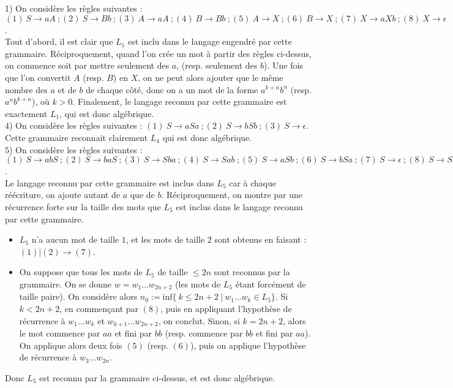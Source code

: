 \documentclass[11pt,a4paper]{article}
\begin{document}
1) On considère les règles suivantes : $(1) \ S \to aA  \ ; (2)  \ S \to Bb \ ; (3) \ A \to aA \ ; (4) \ B \to Bb \ ; (5) \ A \to X \ ; (6) \ B \to X \ ; (7) \ X \to aXb \ ; (8) \ X \to \epsilon$. \\ 
Tout d'abord, il est clair que $L_1$ est inclu dans le langage engendré par cette grammaire. Réciproquement, quand l'on crée un mot à partir des règles ci-dessus, on commence soit par mettre seulement des $a$, (resp. seulement des $b$). Une fois que l'on convertit $A$ (resp. $B$) en $X$, on ne peut alors ajouter que le même nombre des $a$ et de $b$ de chaque côté, donc on a un mot de la forme $a^{k+n}b^n$ (resp. $a^nb^{k+n}$), où $k>0$. Finalement, le langage reconnu par cette grammaire est exactement $L_1$, qui est donc algébrique.
\\

4) On considère les règles suivantes : $ (1) \ S \to aSa \ ; (2) \ S \to bSb \ ; (3) \ S \to \epsilon$. \\ 
Cette grammaire reconnait clairement $L_4$ qui est donc algébrique.
\\

5) On considère les règles suivantes : $(1) \ S \to abS \ ; (2) \ S \to baS \ ; (3) \ S \to Sba \ ; (4) \ S \to Sab \ ; (5) \ S \to aSb \ ; (6) \ S \to bSa \ ; (7) \ S \to \epsilon \ ; (8) \ S \to SS $. \\
Le langage reconnu par cette grammaire est inclus dans $L_5$ car à chaque réécriture, on ajoute autant de $a$ que de $b$. Réciproquement, on montre par une récurrence forte sur la taille des mots que $L_5$ est inclus dans le langage reconnu par cette grammaire.
\begin{itemize}
\item $L_5$ n'a aucun mot de taille $1$, et les mots de taille $2$ sont obtenus en faisant : $(1) | (2) \to (7)$.
\item On suppose que tous les mots de $L_5$ de taille $ \leq 2n$ sont reconnus par la grammaire. On se donne $w=w_1\dots w_{2n+2}$ (les mots de $L_5$ étant forcément de taille paire). On considère alors $n_0 := \text{inf}\{\  k \leq 2n+2 \ | \ w_1\dots w_k \in L_5 \}$. Si $k<2n+2$, en commençant par $(8)$, puis en appliquant l'hypothèse de récurrence à $w_1\dots w_k$ et $w_{k+1}\dots w_{2n+2}$, on conclut. Sinon, si $k=2n+2$, alors le mot commence par $aa$ et fini par $bb$ (resp. commence par $bb$ et fini par $aa$). On applique alors deux fois $(5)$ (resp. $(6)$), puis on applique l'hypothèse de récurrence à $w_3\dots w_{2n}$.
\end{itemize}
Donc $L_5$ est reconnu par la grammaire ci-dessus, et est donc algébrique.
\end{document}
